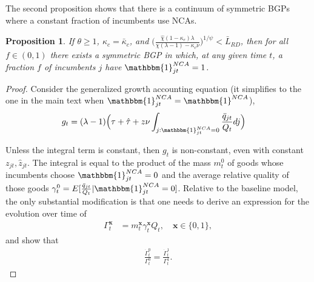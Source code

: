 \documentclass[11pt,english]{article}
\newtheorem{proposition}{Proposition}
\theoremstyle{definition}
\begin{document}
The second proposition shows that there is a continuum of symmetric BGPs where a constant fraction of incumbents use NCAs.

\begin{proposition}\label{proposition:mixedstrategyeq}
	If $\theta \ge 1$, $\kappa_c = \bar{\kappa}_c$, and $\Big( \frac{\hat{\chi} (1-\kappa_{e}) \lambda}{\chi(\lambda-1) - \kappa_{c} \nu} \Big)^{1/\psi} < \bar{L}_{RD}$, then for all $f \in (0,1)$ there exists a symmetric BGP in which, at any given time $t$, a fraction $f$ of incumbents $j$ have $\mathbbm{1}^{NCA}_{jt} = 1$.  
\end{proposition}

\begin{proof}
	Consider the generalized growth accounting equation (it simplifies to the one in the main text when $\mathbbm{1}^{NCA}_{jt} = \mathbbm{1}^{NCA}$),
	\begin{align}
		g_t &= (\lambda -1) \Big( \tau + \hat{\tau} + z \nu \int_{j : \mathbbm{1}^{NCA}_{jt} = 0} \frac{\bar{q}_{jt}}{Q_t} dj \Big) \label{eq:generalized_growth_accounting0}
	\end{align}
	
	Unless the integral term is constant, then $g_t$ is non-constant, even with constant $z_{jt},\hat{z}_{jt}$. The integral is equal to the product of the mass $m_t^0$ of goods whose incumbents choose $\mathbbm{1}^{NCA}_{jt} = 0$ and the average relative quality of those goods $\gamma_t^0 = E[\frac{\bar{q}_{jt}}{Q_t} | \mathbbm{1}^{NCA}_{jt} = 0]$. Relative to the baseline model, the only substantial modification is that one needs to derive an expression for the evolution over time of
	\begin{align}
		\Gamma_t^\mathbf{x} &= m_t^{\mathbf{x}} \gamma_t^{\mathbf{x}} Q_t, \quad \mathbf{x} \in \{0,1\},
	\end{align}
	and show that
	\begin{align}
		\frac{\dot{\Gamma}_t^0}{\Gamma_t^0} = \frac{\dot{\Gamma}_t^1}{\Gamma_t^1}.
	\end{align}


\end{proof}
\end{document}
